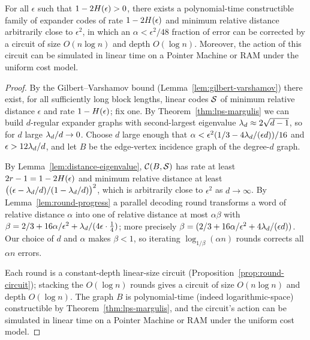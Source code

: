 \begin{theorem}
  \label{thm:explicit}
  For all $\epsilon$ such that $1-2H(\epsilon)>0$, there exists a
  polynomial-time constructible family of expander codes of rate $1-2H(\epsilon)$
  and minimum relative distance arbitrarily close to $\epsilon^2$, in which an
  $\alpha < \epsilon^2/48$ fraction of error can be corrected by a circuit of
  size $O(n\log n)$ and depth $O(\log n)$. Moreover, the action of this circuit
  can be simulated in linear time on a Pointer Machine or RAM under the uniform
  cost model.
\end{theorem}
\begin{proof}
  By the Gilbert--Varshamov bound (Lemma~\ref{lem:gilbert-varshamov}) there
  exist, for all sufficiently long block lengths, linear codes $\mathcal{S}$ of minimum
  relative distance $\epsilon$ and rate $1-H(\epsilon)$; fix one. By
  Theorem~\ref{thm:lps-margulis} we can build $d$-regular expander graphs with
  second-largest eigenvalue $\lambda_d \approx 2\sqrt{d-1}$, so for $d$ large
  $\lambda_d/d \to 0$. Choose $d$ large enough that
  $\alpha < \epsilon^2(1/3 - 4\lambda_d/(\epsilon d))/16$ and
  $\epsilon > 12\lambda_d/d$, and let $B$ be the edge-vertex incidence graph of
  the degree-$d$ graph.

  By Lemma~\ref{lem:distance-eigenvalue}, $\mathcal{C}(B,\mathcal{S})$ has rate at least
  $2r-1 = 1-2H(\epsilon)$ and minimum relative distance at least
  $\bigl((\epsilon-\lambda_d/d)/(1-\lambda_d/d)\bigr)^2$, which is arbitrarily
  close to $\epsilon^2$ as $d\to\infty$. By Lemma~\ref{lem:round-progress} a
  parallel decoding round transforms a word of relative distance $\alpha$ into
  one of relative distance at most $\alpha\beta$ with
  $\beta = 2/3 + 16\alpha/\epsilon^2 + \lambda_d/(4\epsilon \cdot \tfrac14)$;
  more precisely $\beta = (2/3 + 16\alpha/\epsilon^2 + 4\lambda_d/(\epsilon d))$.
  Our choice of $d$ and $\alpha$ makes $\beta<1$, so iterating
  $\log_{1/\beta}(\alpha n)$ rounds corrects all $\alpha n$ errors.

  Each round is a constant-depth linear-size circuit
  (Proposition~\ref{prop:round-circuit}); stacking the $O(\log n)$ rounds gives
  a circuit of size $O(n\log n)$ and depth $O(\log n)$. The graph $B$ is
  polynomial-time (indeed logarithmic-space) constructible by
  Theorem~\ref{thm:lps-margulis}, and the circuit's action can be simulated in
  linear time on a Pointer Machine or RAM under the uniform cost model.
\end{proof}

